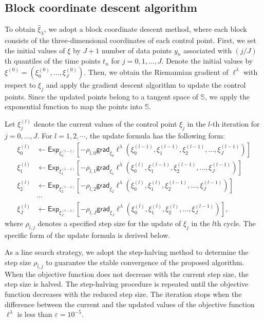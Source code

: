 \subsection*{Block coordinate descent algorithm}\label{block-coordinate-descent-algorithm}

To obtain \(\hat{\xi}_\lambda\), we adopt a block coordinate descent method, where each block consists of the three-dimensional coordinates of each control point.
First, we set the initial values of \(\xi\) by \(J+1\) number of data points \(y_n\) associated with \mbox{$(j/J)$th} quantiles of the time points \(t_n\) for \(j=0,1,\ldots, J\). Denote the initial values by \(\xi^{(0)} = (\xi^{(0)}_0, \ldots, \xi^{(0)}_J)\). Then, we obtain the Riemannian gradient of \(\ell^\lambda\) with respect to \(\xi_j\) and apply the gradient descent algorithm to update the control points. Since the updated points belong to a tangent space of \(\mathbb{S}\), we apply the exponential function to map the points into \(\mathbb{S}\).

Let \(\xi_j^{(l)}\) denote the current values of the control point \(\xi_j\) in the \(l\)-th iteration for \(j=0,\ldots, J\). For \(l=1,2,\cdots\), the update formula has the following form:
\begin{align*}
\xi_0^{(l)} &\leftarrow \mathsf{Exp}_{\xi_0^{(l-1)}} \left[-\rho_{l, 0} \mathsf{grad}_{\xi_0} \ell^\lambda \left(\xi_0^{(l-1)}, \xi_1^{(l-1)}, \xi_2^{(l-1)}, \ldots, \xi_J^{(l-1)}\right) \right]
\\
\xi_1^{(l)} &\leftarrow \mathsf{Exp}_{\xi_1^{(l-1)}} \left[-\rho_{l, 1} \mathsf{grad}_{\xi_1} \ell^\lambda \left(\xi_0^{(l)}, \xi_1^{(l-1)}, \xi_2^{(l-1)}, \ldots, \xi_J^{(l-1)}\right) \right]
\\
\xi_2^{(l)} &\leftarrow \mathsf{Exp}_{\xi_2^{(l-1)}} \left[-\rho_{l, 2} \mathsf{grad}_{\xi_2} \ell^\lambda \left(\xi_0^{(l)}, \xi_1^{(l)}, \xi_2^{(l-1)}, \ldots, \xi_J^{(l-1)}\right) \right]
\\
&\cdots
\\
\xi_J^{(l)} &\leftarrow \mathsf{Exp}_{\xi_J^{(l-1)}} \left[-\rho_{l, J} \mathsf{grad}_{\xi_J} \ell^\lambda \left(\xi_0^{(l)}, \xi_1^{(l)}, \xi_2^{(l)}, \ldots, \xi_J^{(l-1)}\right) \right],
\end{align*}
where \(\rho_{l,j}\) denotes a specified step size for the update of \(\xi_j\) in the \(l\)th cycle. The specific form of the update formula is derived below.

As a line search strategy, we adopt the step-halving method to determine the step size \(\rho_{l,j}\) to guarantee the stable convergence of the proposed algorithm.
When the objective function does not decrease with the current step size, the step size is halved. The step-halving procedure is repeated until the objective function decreases with the reduced step size. The iteration stops when the difference between the current and
the updated values of the objective function \(\ell^\lambda\) is less than \(\varepsilon = 10^{-5}\).

